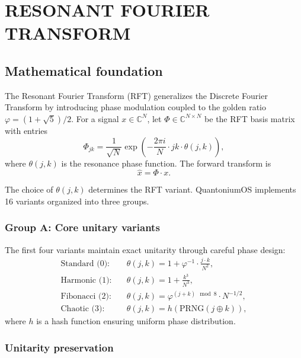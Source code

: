 \documentclass[aip,twocolumn,letterpaper]{revtex4}
\begin{document}
\section{RESONANT FOURIER TRANSFORM}

\subsection{Mathematical foundation}

The Resonant Fourier Transform (RFT) generalizes the Discrete Fourier Transform by introducing phase modulation coupled to the golden ratio \(\varphi = (1 + \sqrt{5})/2\). For a signal \(x \in \mathbb{C}^N\), let \(\Phi \in \mathbb{C}^{N \times N}\) be the RFT basis matrix with entries
\begin{equation}
\Phi_{jk} = \frac{1}{\sqrt{N}} \exp\left( -\frac{2\pi i}{N} \cdot jk \cdot \theta(j,k) \right),
\label{eq:rft-basis}
\end{equation}
where \(\theta(j,k)\) is the resonance phase function. The forward transform is
\begin{equation}
\hat{x} = \Phi \cdot x.
\label{eq:forward}
\end{equation}

The choice of \(\theta(j,k)\) determines the RFT variant. QuantoniumOS implements 16 variants organized into three groups.

\subsubsection{Group A: Core unitary variants}

The first four variants maintain exact unitarity through careful phase design:
\begin{align}
\text{Standard (0):} \quad & \theta(j,k) = 1 + \varphi^{-1} \cdot \frac{j \cdot k}{N^2}, \\
\text{Harmonic (1):} \quad & \theta(j,k) = 1 + \frac{k^3}{N^3}, \\
\text{Fibonacci (2):} \quad & \theta(j,k) = \varphi^{(j+k) \mod 8} \cdot N^{-1/2}, \\
\text{Chaotic (3):} \quad & \theta(j,k) = h(\mathrm{PRNG}(j \oplus k)),
\end{align}
where \(h\) is a hash function ensuring uniform phase distribution.

\subsubsection{Unitarity preservation}
\end{document}
